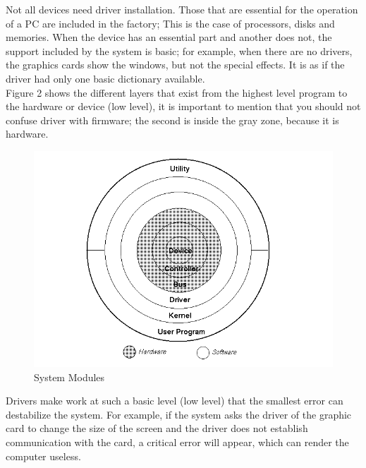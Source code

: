 \documentclass[12pt,twoside]{article}
\begin{document}
Not all devices need driver installation. Those that are essential for the operation of a PC are included in the factory; This is the case of processors, disks and memories. When the device has an essential part and another does not, the support included by the system is basic; for example, when there are no drivers, the graphics cards show the windows, but not the special effects. It is as if the driver had only one basic dictionary available.\\

Figure 2 shows the different layers that exist from the highest level program to the hardware or device (low level), it is important to mention that you should not confuse driver with firmware; the second is inside the gray zone, because it is hardware.\\
\begin{figure}[H]
\centering
\includegraphics[width = 1\hsize]{./figures/esquema2.PNG}
\caption{System Modules}
\label{fig:modulos sistema}
\end{figure}



Drivers make work at such a basic level (low level) that the smallest error can destabilize the system. For example, if the system asks the driver of the graphic card to change the size of the screen and the driver does not establish communication with the card, a critical error will appear, which can render the computer useless.\\
\end{document}
